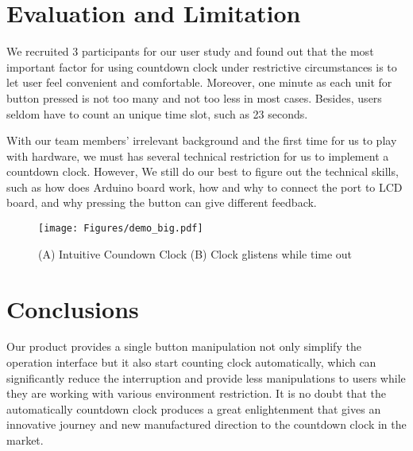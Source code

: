 \documentclass{sig-alternate-ipsn13}
\begin{document}

\section{Evaluation and Limitation}
We recruited 3 participants for our user study and found out that the most important factor for using countdown clock under restrictive circumstances is to let user feel convenient and comfortable. Moreover, one minute as each unit for button pressed is not too many and not too less in most cases. Besides, users seldom have to count an unique time slot, such as 23 seconds.

With our team members' irrelevant background and the first time for us to play with hardware, we must has several technical restriction for us to implement a countdown clock. However, We still do our best to figure out the technical skills, such as how does Arduino board work, how and why to connect the port to LCD board, and why pressing the button can give different feedback.


\begin{figure}
  \centering
  \texttt{[image: Figures/demo\_big.pdf]}
  \caption{(A) Intuitive Coundown Clock (B) Clock glistens while time out}
  \label{fig:demo1}
\end{figure}

\section{Conclusions}
Our product provides a single button manipulation not only simplify the operation interface but it also start counting clock automatically, which can significantly reduce the interruption and provide less manipulations to users while they are working with various environment restriction.
It is no doubt that the automatically countdown clock produces a great enlightenment that gives an innovative journey and new manufactured direction to the countdown clock in the market.
\end{document}
